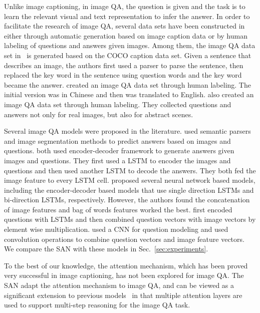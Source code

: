\documentclass[10pt,twocolumn,letterpaper]{article}
\begin{document}
Unlike image captioning, in image QA, the question is given and the task is to
learn the relevant visual and text representation to infer the answer.  In
order to facilitate the research of image QA, several data sets have been
constructed in~\cite{malinowski2015ask, ren2015imageqa, gao2015you,
  antol2015vqa} either through automatic generation based on image caption data
or by human labeling of questions and answers given images. Among them, the
image QA data set in~\cite{ren2015imageqa} is generated based on the COCO
caption data set. Given a sentence that describes an image, the authors first
used a parser to parse the sentence, then replaced the key word in the sentence
using question words and the key word became the answer. \cite{gao2015you}
created an image QA data set through human labeling. The initial version was in
Chinese and then was translated to English. \cite{antol2015vqa} also created an
image QA data set through human labeling. They collected questions and answers
not only for real images, but also for abstract scenes.

Several image QA models were proposed in the
literature. \cite{malinowski2014multi} used semantic parsers and image
segmentation methods to predict answers based on images and
questions. \cite{malinowski2015ask, gao2015you} both used encoder-decoder
framework to generate answers given images and questions. They first used a
LSTM to encoder the images and questions and then used another LSTM to decode
the answers. They both fed the image feature to every LSTM
cell. \cite{ren2015imageqa} proposed several neural network based models,
including the encoder-decoder based models that use single direction LSTMs and
bi-direction LSTMs, respectively. However, the authors found the concatenation
of image features and bag of words features worked the best.
\cite{antol2015vqa} first encoded questions with LSTMs and then combined
question vectors with image vectors by element wise
multiplication. \cite{ma2015learning} used a CNN for question modeling and used
convolution operations to combine question vectors and image feature
vectors. We compare the SAN with these models in Sec.~\ref{sec:experiments}.

To the best of our knowledge, the attention mechanism, which has been proved
very successful in image captioning, has not been explored for image QA. The
SAN adapt the attention mechanism to image QA, and can be viewed as a
significant extension to previous models~\cite{xu2015show} in that multiple
attention layers are used to support multi-step reasoning for the image QA
task.
\end{document}
